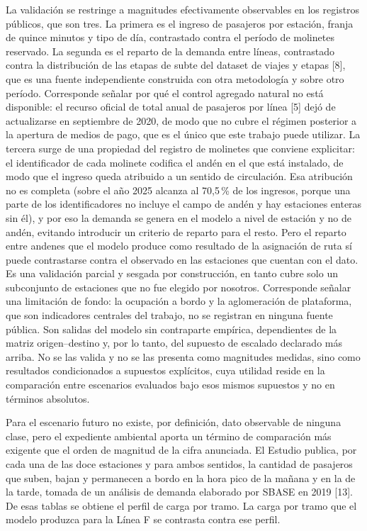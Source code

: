 \documentclass{article}
\begin{document}
La validación se restringe a magnitudes efectivamente observables en los registros públicos, que son tres. La
primera es el ingreso de pasajeros por estación, franja de quince minutos y tipo de día, contrastado contra
el período de molinetes reservado. La segunda es el reparto de la demanda entre líneas, contrastado contra la
distribución de las etapas de subte del dataset de viajes y etapas [8], que es una fuente independiente
construida con otra metodología y sobre otro período. Corresponde señalar por qué el control agregado natural
no está disponible: el recurso oficial de total anual de pasajeros por línea [5] dejó de actualizarse en
septiembre de 2020, de modo que no cubre el régimen posterior a la apertura de medios de pago, que es el
único que este trabajo puede utilizar. La tercera surge de una propiedad del registro de molinetes que
conviene explicitar:
el identificador de cada molinete codifica el andén en el que está instalado, de modo que el ingreso queda
atribuido a un sentido de circulación. Esa atribución no es completa (sobre el año 2025 alcanza al
  70,5\,\% de los ingresos, porque una parte de los identificadores no incluye el campo de andén y hay
estaciones enteras sin él), y por eso la demanda se genera en el modelo a nivel de estación y no de andén,
evitando introducir un criterio de reparto para el resto. Pero el reparto entre andenes que el modelo produce
como resultado de la asignación de ruta sí puede contrastarse contra el observado en las estaciones que
cuentan con el dato. Es una validación parcial y sesgada por construcción, en tanto cubre solo un subconjunto
de estaciones que no fue elegido por nosotros.
Corresponde señalar una limitación de fondo: la ocupación a bordo y la aglomeración de plataforma, que son
indicadores centrales del trabajo, no se registran en ninguna fuente pública. Son salidas del modelo sin
contraparte empírica, dependientes de la matriz origen--destino y, por lo tanto, del supuesto de escalado
declarado más arriba. No se las valida y no se las presenta como magnitudes medidas, sino como resultados
condicionados a supuestos explícitos, cuya utilidad reside en la comparación entre escenarios evaluados bajo
esos mismos supuestos y no en términos absolutos.

Para el escenario futuro no existe, por definición, dato observable de ninguna clase, pero el expediente
ambiental aporta un término de comparación más exigente que el orden de magnitud de la cifra anunciada. El
Estudio publica, por cada una de las doce estaciones y para ambos sentidos, la cantidad de pasajeros que
suben, bajan y permanecen a bordo en la hora pico de la mañana y en la de la tarde, tomada de un análisis de
demanda elaborado por SBASE en 2019 [13]. De esas tablas se obtiene el perfil de carga por tramo. La carga por tramo que el modelo produzca para la Línea F se contrasta
contra ese perfil.
\end{document}
